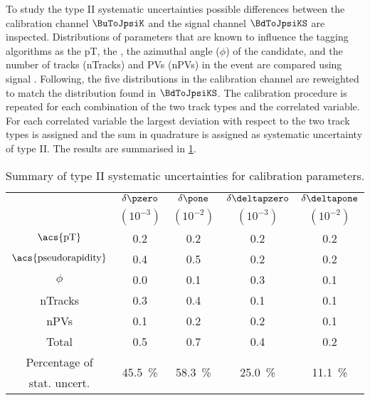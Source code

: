 To study the type II systematic uncertainties possible differences between the
calibration channel $\BuToJpsiK$ and the signal channel $\BdToJpsiKS$ are
inspected. Distributions of parameters that are known to influence the tagging
algorithms as the \acf{pT}, the \pseudorapidity, the azimuthal angle ($\phi$) of
the \Bmeson candidate, and the number of tracks (nTracks) and \aclp{PV}
(n\acsp{PV}) in the event are compared using signal \sweights. Following, the
five distributions in the calibration channel are reweighted to match the
distribution found in $\BdToJpsiKS$. The calibration procedure is repeated for
each combination of the two track types and the correlated variable. For each
correlated variable the largest deviation with respect to the two track types is
assigned and the sum in quadrature is assigned as systematic uncertainty of type
II. The results are summarised in
\cref{tab:flavour_tagging:calibration:os:systematics}.
%
\begin{table}
  \centering
  \caption{Summary of type II systematic uncertainties for \OS calibration parameters.}
  \label{tab:flavour_tagging:calibration:os:systematics}
  \begin{tabular}{ccccc}
    \toprule
      & $\delta\pzero$ & $\delta\pone$ & $\delta\deltapzero$ & $\delta\deltapone$ \\
      & $(10^{-3})$    & $(10^{-2})$   & $(10^{-3})$         & $(10^{-2})$        \\
    \midrule
    $\text{\acs{pT}}$             & 0.2 & 0.2 & 0.2 & 0.2 \\
    $\text{\acs{pseudorapidity}}$ & 0.4 & 0.5 & 0.2 & 0.2 \\
    $\phi$                        & 0.0 & 0.1 & 0.3 & 0.1 \\
    nTracks                       & 0.3 & 0.4 & 0.1 & 0.1 \\
    nPVs                          & 0.1 & 0.2 & 0.2 & 0.1 \\
    \midrule
      Total                       & 0.5 & 0.7 & 0.4 & 0.2 \\
    \midrule
    Percentage of & 
    \multirow{2}[2]{*}{\SI{45.5}{\percent}} & 
    \multirow{2}[2]{*}{\SI{58.3}{\percent}} & 
    \multirow{2}[2]{*}{\SI{25.0}{\percent}} & 
    \multirow{2}[2]{*}{\SI{11.1}{\percent}} \\
    stat. uncert. \\
    \bottomrule
  \end{tabular}
\end{table}
%
